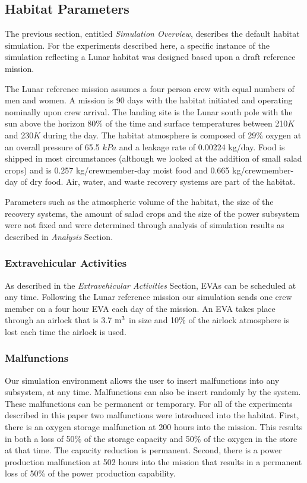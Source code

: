 \documentclass[submit]{aiaa}
\begin{document}
\subsection{Habitat Parameters}
\label{sec:hab}

The previous section, entitled \emph{Simulation Overview},
describes the default habitat simulation.  
For the experiments described here, a specific instance of the simulation reflecting a Lunar habitat was designed based upon a draft reference mission.

The Lunar reference mission assumes a four person crew with equal numbers of
men and women.  A mission is 90 days with the habitat initiated and
operating nominally upon crew arrival.  The landing site is the Lunar
south pole with the sun above the horizon 80\% of the time and surface
temperatures between 210$K$ and 230$K$ during the day.  The habitat
atmosphere is composed of 29\% oxygen at an overall pressure of 65.5
$kPa$ and a leakage rate of 0.00224 kg/day.  Food is shipped in most
circumstances (although we looked at the addition of small salad
crops) and is 0.257 kg/crewmember-day moist food and 0.665
kg/crewmember-day of dry food.  Air, water, and waste recovery systems
are part of the habitat.

Parameters such as the atmospheric volume of the habitat, the size of the recovery systems, the amount of salad crops and the
size of the power subsystem were not fixed and were determined through
analysis of simulation results as described in \emph{Analysis} Section.

\subsubsection{Extravehicular Activities}

As described in the \emph{Extravehicular Activities} Section,
EVAs can be scheduled at any time.
Following the Lunar reference mission our simulation sends one crew
member on a four hour EVA each day of the mission.  An EVA takes place
through an airlock that is 3.7 ${\rm m}^3$ in size and 10\% of the airlock
atmosphere is lost each time the airlock is used.  

\subsubsection{Malfunctions}

Our simulation environment allows the user to insert  malfunctions into any
subsystem, at any time.
Malfunctions can also be insert randomly by the system.
These malfunctions can be permanent or temporary.  For all of the
experiments described in this paper two malfunctions were introduced
into the habitat.  First, there is an oxygen storage malfunction
at 200 hours into the mission.  This results in both a loss of 50\% of
the storage capacity and 50\% of the oxygen in the store at that time.
The capacity reduction is permanent.  Second, there is a power
production malfunction at 502 hours into the mission that results in a
permanent loss of 50\% of the power production capability.
\end{document}
